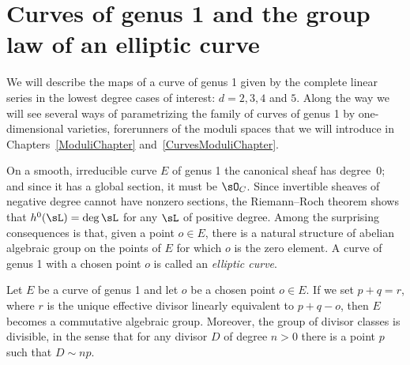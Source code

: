 \section{Curves of genus 1 and the group law of an elliptic curve}

We will describe the maps of a curve of genus 1 given by
the complete linear series in the lowest degree cases of interest: $d =  2, 3, 4$ and $5$. Along the
way we will see several ways of parametrizing the family of curves of genus 1 by one-dimensional varieties,
%
forerunners of the moduli spaces that we will introduce in Chapters~\ref{ModuliChapter} and~\ref{CurvesModuliChapter}.


On a smooth, irreducible curve $E$ of genus 1 the canonical sheaf has degree~0;
and since it has a
%
global section,
it must be $\sO_C$.
Since invertible sheaves of negative degree cannot have
nonzero sections,
the Riemann--Roch theorem
%
shows that
$h^0( \sL) = \deg \sL$ for any $\sL$ of positive degree. Among the surprising consequences is that, given
%
a point $o\in E$, there is a natural structure of abelian algebraic group on the points of $E$ for which $o$
is the zero element. A curve of genus 1 with a chosen point $o$ is called an \emph{elliptic curve}.
%

\begin{proposition}\label{group law} Let $E$ be a curve of genus 1 and let $o$ be a chosen point $o\in E$.
If we set $p+q = r$, where $r$ is the unique effective divisor
linearly equivalent to $p+q-o$, then $E$ becomes a
commutative algebraic group.
Moreover, the group of divisor classes is
divisible,
%
in the sense that for any divisor $D$ of degree $n>0$
 there is a point $p$ such that $D\sim np$.
\unif
 \end{proposition}

